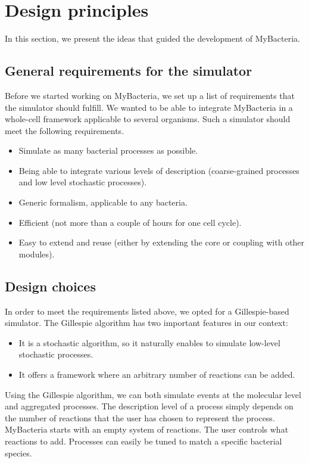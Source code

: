 \section{Design principles}

In this section, we present the ideas that guided the development of MyBacteria.

\subsection{General requirements for the simulator}

Before we started working on MyBacteria,
we set up a list of requirements that the simulator should fulfill.
We wanted to be able to integrate MyBacteria in a whole-cell framework
applicable to several organisms.
Such a simulator should meet the following requirements.
\begin{itemize}
  \item Simulate as many bacterial processes as possible.
  \item Being able to integrate various levels of description
  (coarse-grained processes and low level stochastic processes).
  \item Generic formalism, applicable to any bacteria.
  \item Efficient (not more than a couple of hours for one cell cycle).
  \item Easy to extend and reuse
  (either by extending the core or coupling with other modules).
\end{itemize}

\subsection{Design choices}

In order to meet the requirements listed above,
we opted for a Gillespie-based simulator.
The Gillespie algorithm has two important features in our context:
\begin{itemize}
  \item It is a stochastic algorithm, so it naturally enables to simulate
  low-level stochastic processes.
  \item It offers a framework where an arbitrary number of reactions can
  be added.
\end{itemize}
Using the Gillespie algorithm, we can both simulate events at the molecular
level and aggregated processes.
The description level of a process simply depends on the number of reactions
that the user has chosen to represent the process.
MyBacteria starts with an empty system of reactions.
The user controls what reactions to add.
Processes can easily be tuned to match a specific bacterial species.

